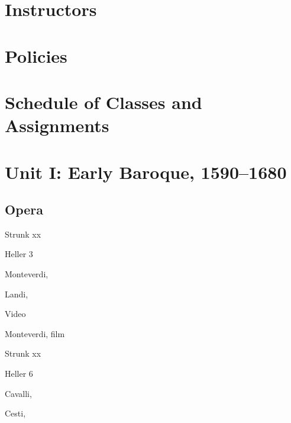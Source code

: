 \documentclass{syllabus}
\begin{document}

\printCourseInfo

\section*{Instructors}

\begin{PersonID}
\end{PersonID}

\printPersonList

\section*{Policies}

\StandardPolicies


\section*{Schedule of Classes and Assignments}

\section*{Unit I: Early Baroque, 1590--1680}
\subsection*{Opera}



\begin{Asst}{\ReadingList}
\item Strunk xx
\item Heller 3
\end{Asst}

\begin{Asst}{\MusicList}
\item Monteverdi, 
\item Landi, 
\end{Asst}

\begin{Asst}{Video}
\item Monteverdi,  film
\end{Asst}


\begin{Reading}
\item Strunk xx
\item Heller 6
\end{Reading}

\begin{Music}
\item Cavalli, 
\item Cesti, 
\end{Music}
\end{document}
